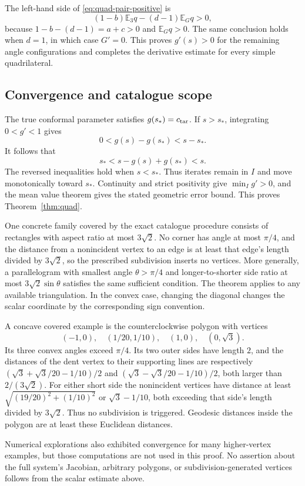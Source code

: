 \documentclass[11pt,a4paper]{article}
\theoremstyle{definition}
\theoremstyle{remark}
\numberwithin{equation}{section}
\begin{document}
The left-hand side of \eqref{eq:quad-pair-positive} is
\[
(1-b)\mathbb E_3 q-(d-1)\mathbb E_G q>0,
\]
because $1-b-(d-1)=a+c>0$ and $\mathbb E_G q>0$. The same conclusion holds when $d=1$, in which case $G'=0$. This proves $g'(s)>0$ for the remaining angle configurations and completes the derivative estimate for every simple quadrilateral.

\subsection{Convergence and catalogue scope}
The true conformal parameter satisfies $g(s_*)=c_{\rm tar}$. If $s>s_*$, integrating $0<g'<1$ gives
\[
0<g(s)-g(s_*)<s-s_*.
\]
It follows that
\[
s_*<s-g(s)+g(s_*)<s.
\]
The reversed inequalities hold when $s<s_*$. Thus iterates remain in $I$ and move monotonically toward $s_*$. Continuity and strict positivity give $\min_Ig'>0$, and the mean value theorem gives the stated geometric error bound. This proves Theorem~\ref{thm:quad}.

One concrete family covered by the exact catalogue procedure consists of rectangles with aspect ratio at most $3\sqrt2$. No corner has angle at most $\pi/4$, and the distance from a nonincident vertex to an edge is at least that edge's length divided by $3\sqrt2$, so the prescribed subdivision inserts no vertices. More generally, a parallelogram with smallest angle $\theta>\pi/4$ and longer-to-shorter side ratio at most $3\sqrt2\sin\theta$ satisfies the same sufficient condition. The theorem applies to any available triangulation. In the convex case, changing the diagonal changes the scalar coordinate by the corresponding sign convention.

A concave covered example is the counterclockwise polygon with vertices
\[
(-1,0),\quad (1/20,1/10),\quad (1,0),\quad (0,\sqrt3).
\]
Its three convex angles exceed $\pi/4$. Its two outer sides have length $2$, and the distances of the dent vertex to their supporting lines are respectively
$(\sqrt3+\sqrt3/20-1/10)/2$ and
$(\sqrt3-\sqrt3/20-1/10)/2$, both larger than $2/(3\sqrt2)$. For either short side the nonincident vertices have distance at least $\sqrt{(19/20)^2+(1/10)^2}$ or $\sqrt3-1/10$, both exceeding that side's length divided by $3\sqrt2$. Thus no subdivision is triggered. Geodesic distances inside the polygon are at least these Euclidean distances.

Numerical explorations also exhibited convergence for many higher-vertex examples, but those computations are not used in this proof. No assertion about the full system's Jacobian, arbitrary polygons, or subdivision-generated vertices follows from the scalar estimate above.
\end{document}
